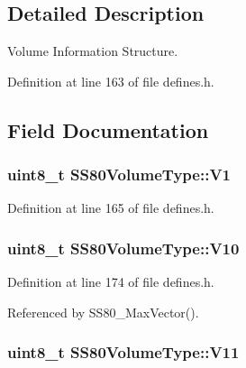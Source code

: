 \subsection{Detailed Description}
Volume Information Structure. 

Definition at line 163 of file defines.\+h.



\subsection{Field Documentation}
\subsubsection[{\texorpdfstring{V1}{V1}}]{\setlength{\rightskip}{0pt plus 5cm}uint8\+\_\+t S\+S80\+Volume\+Type\+::\+V1}\hypertarget{structSS80VolumeType_a42641e28498bceac017fcc016f7441a5}{}\label{structSS80VolumeType_a42641e28498bceac017fcc016f7441a5}


Definition at line 165 of file defines.\+h.

\subsubsection[{\texorpdfstring{V10}{V10}}]{\setlength{\rightskip}{0pt plus 5cm}uint8\+\_\+t S\+S80\+Volume\+Type\+::\+V10}\hypertarget{structSS80VolumeType_a5417c71bb5987247189a7cef0c47f333}{}\label{structSS80VolumeType_a5417c71bb5987247189a7cef0c47f333}


Definition at line 174 of file defines.\+h.



Referenced by S\+S80\+\_\+\+Max\+Vector().

\subsubsection[{\texorpdfstring{V11}{V11}}]{\setlength{\rightskip}{0pt plus 5cm}uint8\+\_\+t S\+S80\+Volume\+Type\+::\+V11}\hypertarget{structSS80VolumeType_a2d8a582e92f18564ced53fc8e5549e53}{}\label{structSS80VolumeType_a2d8a582e92f18564ced53fc8e5549e53}


